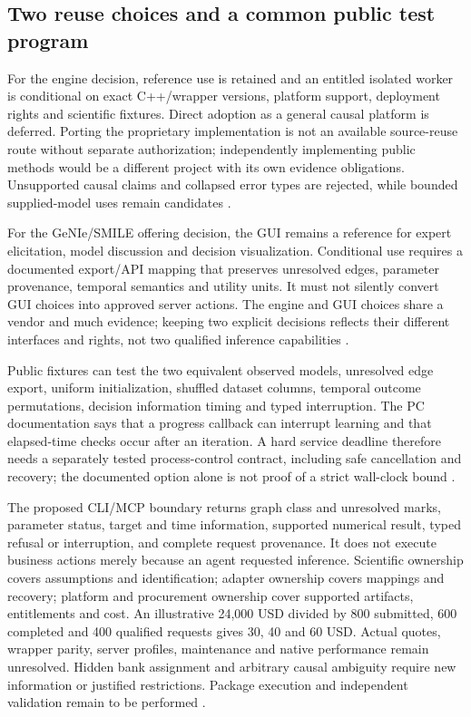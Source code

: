 \subsection{Two reuse choices and a common public test program}
For the engine decision, reference use is retained and an entitled isolated
worker is conditional on exact C++/wrapper versions, platform support,
deployment rights and scientific fixtures. Direct adoption as a general
causal platform is deferred. Porting the proprietary implementation is not
an available source-reuse route without separate authorization; independently
implementing public methods would be a different project with its own
evidence obligations. Unsupported causal claims and collapsed error types
are rejected, while bounded supplied-model uses remain candidates
\cite{exec13_smile_intro,exec13_smile_license,exec24_smile_choice}.

For the GeNIe/SMILE offering decision, the GUI remains a reference for expert
elicitation, model discussion and decision visualization. Conditional use
requires a documented export/API mapping that preserves unresolved edges,
parameter provenance, temporal semantics and utility units. It must not
silently convert GUI choices into approved server actions. The engine and
GUI choices share a vendor and much evidence; keeping two explicit
decisions reflects their different interfaces and rights, not two qualified
inference capabilities \cite{exec24_smile_choice}.

Public fixtures can test the two equivalent observed models, unresolved
edge export, uniform initialization, shuffled dataset columns, temporal
outcome permutations, decision information timing and typed interruption.
The PC documentation says that a progress callback can interrupt learning
and that elapsed-time checks occur after an iteration. A hard service
deadline therefore needs a separately tested process-control contract,
including safe cancellation and recovery; the documented option alone is
not proof of a strict wall-clock bound
\cite{exec13_smile_pc,exec24_smile_choice}.

The proposed CLI/MCP boundary returns graph class and unresolved marks,
parameter status, target and time information, supported numerical result,
typed refusal or interruption, and complete request provenance. It does
not execute business actions merely because an agent requested inference.
Scientific ownership covers assumptions and identification; adapter
ownership covers mappings and recovery; platform and procurement ownership
cover supported artifacts, entitlements and cost. An illustrative
24,000 USD divided by 800 submitted, 600 completed and 400 qualified
requests gives 30, 40 and 60 USD. Actual quotes, wrapper parity, server
profiles, maintenance and native performance remain unresolved. Hidden
bank assignment and arbitrary causal ambiguity require new information or
justified restrictions. Package execution and independent validation remain to be performed \cite{exec24_smile_choice}.


